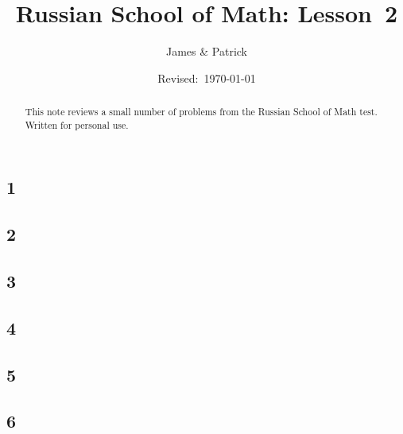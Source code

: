 \documentclass[12pt]{article}
\title{Russian School of Math: Lesson~2}
\author{James \& Patrick}
\date{Revised:~\today}
\begin{document}
\maketitle
\begin{abstract}\setlength{\parindent}{0pt}%
This note reviews a small number of problems from the Russian School of Math test. Written for personal use.
\end{abstract}

\thispagestyle{empty}
\clearpage

\subsection*{1}

\begin{solution}
  
\end{solution}

\subsection*{2}

\begin{solution}
  
\end{solution}

\subsection*{3}

\begin{solution}
  
\end{solution}

\subsection*{4}

\begin{solution}
  
\end{solution}

\subsection*{5}

\begin{solution}
  
\end{solution}

\subsection*{6}

\begin{solution}
  
\end{solution}
\end{document}
